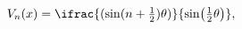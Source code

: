 \[\mathop{V_{n}\/}\nolimits\!\left(x\right)=\ifrac{(\mathop{\sin\/}\nolimits(n+%
\tfrac{1}{2})\theta)}{\mathop{\sin\/}\nolimits\!\left(\tfrac{1}{2}\theta\right%
)},\]